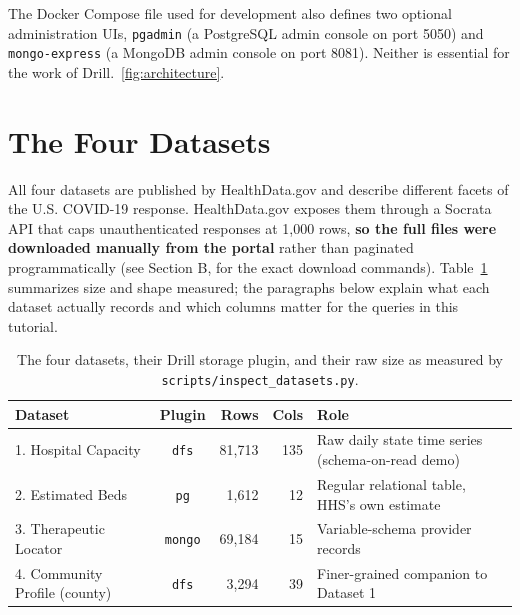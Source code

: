 \documentclass[11pt,a4paper]{article}
\begin{document}
The Docker Compose file used for development also defines two optional
administration UIs, \texttt{pgadmin} (a PostgreSQL admin console on port 5050) and
\texttt{mongo-express} (a MongoDB admin console on port 8081). Neither is essential for the work of Drill.~\ref{fig:architecture}.




\section{The Four Datasets}
\label{sec:datasets}

All four datasets are published by HealthData.gov and describe different facets of
the U.S. COVID-19 response. HealthData.gov exposes them through a Socrata API that
caps unauthenticated responses at 1{,}000 rows, \textbf{so the full files were downloaded
manually from the portal} rather than paginated programmatically (see Section B, for the exact download commands). Table~\ref{tab:datasets}
summarizes size and shape measured; the paragraphs below explain what each
dataset actually records and which columns matter for the queries in this tutorial.

\begin{table}[htbp]
\centering
\small
\begin{tabular}{@{}p{3.2cm}c r r p{5.4cm}@{}}
\toprule
\textbf{Dataset} & \textbf{Plugin} & \textbf{Rows} & \textbf{Cols}  & \textbf{Role} \\
\midrule
1. Hospital Capacity      & \texttt{dfs}   & 81{,}713 & 135 & Raw daily state time series (schema-on-read demo) \\
2. Estimated Beds         & \texttt{pg}    & 1{,}612  & 12   & Regular relational table, HHS's own estimate \\
3. Therapeutic Locator    & \texttt{mongo} & 69{,}184 & 15   & Variable-schema provider records \\
4. Community Profile (county) & \texttt{dfs} & 3{,}294 & 39   & Finer-grained companion to Dataset 1 \\

\bottomrule
\end{tabular}
\caption{The four datasets, their Drill storage plugin, and their raw size as measured
by \texttt{scripts/inspect\_datasets.py}.}
\label{tab:datasets}
\end{table}
\end{document}
